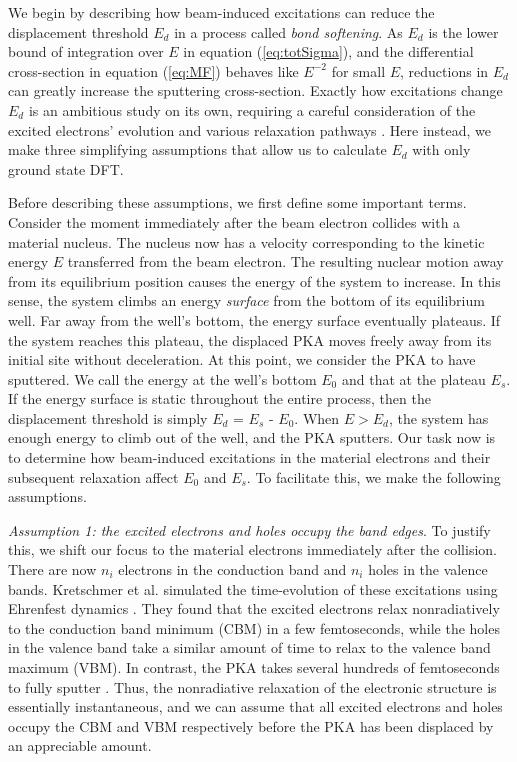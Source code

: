 \documentclass{article}
\begin{document}
We begin by describing how beam-induced excitations can reduce the
displacement threshold $E_d$ in a process called \textit{bond softening}.
As $E_d$ is the lower bound of integration over $E$ in equation
(\ref{eq:totSigma}), and the differential cross-section in equation
(\ref{eq:MF}) behaves like $E^{-2}$ for small $E$, reductions in $E_d$ can
greatly increase the sputtering cross-section.
Exactly how excitations change $E_d$ is an ambitious study on its own,
requiring a careful consideration of the excited electrons' evolution and
various relaxation pathways \cite{Lingerfelt2019a}.
Here instead, we make three simplifying assumptions that allow us to calculate
$E_d$ with only ground state DFT.

Before describing these assumptions, we first define some important terms.
Consider the moment immediately after the beam electron collides with a
material nucleus.
The nucleus now has a velocity corresponding to the kinetic energy
$E$ transferred from the beam electron.
The resulting nuclear motion away from its equilibrium position causes the
energy of the system to increase.
In this sense, the system climbs an energy \textit{surface} from the bottom of its
equilibrium well.
Far away from the well's bottom, the energy surface eventually plateaus.
If the system reaches this plateau, the displaced PKA moves
freely away from its initial site without deceleration. At this point, we
consider the PKA to have sputtered. We call the energy at the well's bottom
$E_0$ and that at the plateau $E_s$.
If the energy surface is static throughout the entire process, then the
displacement threshold is simply $E_d$ = $E_s$ - $E_0$.
When $E>E_d$, the system has enough energy to climb out of the well,
and the PKA sputters.  Our task now is to determine how beam-induced
excitations in the material electrons and their subsequent relaxation affect
$E_0$ and $E_s$.  To facilitate this, we make the following assumptions.

\medskip\noindent
\textit{Assumption 1: the excited electrons and holes occupy the band edges}.
To justify this, we shift our focus to the material electrons immediately after
the collision.  There are now $n_i$ electrons in the conduction band and $n_i$
holes in the valence bands.  Kretschmer et al. simulated the time-evolution of
these excitations using Ehrenfest dynamics \cite{Kretschmer2020,Li2005}.
They found that the excited electrons relax nonradiatively to the conduction
band minimum (CBM) in a few femtoseconds, while the holes in the valence band
take a similar amount of time to relax to the valence band maximum (VBM).
In contrast, the PKA takes several hundreds of femtoseconds to fully sputter
\cite{Yoshimura2018}.
Thus, the nonradiative relaxation of the electronic structure is essentially
instantaneous, and we can assume that all excited electrons and holes occupy
the CBM and VBM respectively before the PKA has been displaced by an
appreciable amount.
\end{document}
